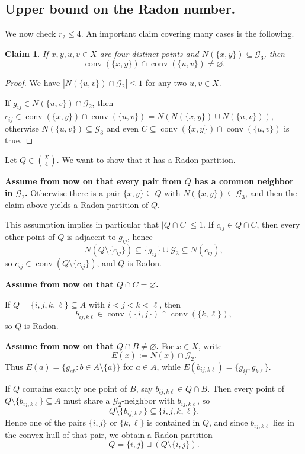 \documentclass[11pt]{article}
\newtheorem{claim}[thm]{Claim}
\theoremstyle{definition}
\newcommand{\G}{\mathcal{G}}
\newcommand{\conv}{\operatorname{conv}}
\begin{document}
\subsection{Upper bound on the Radon number.}
We now check $r_2 \leq 4$. An important claim covering many cases is the following.

\begin{claim}
If $x,y,u,v\in X$ are four distinct points and $N(\{x,y\})\subseteq\G_3$, then
\[
\conv(\{x,y\})\cap\conv(\{u,v\})\ne\varnothing.
\]
\end{claim}

\begin{proof}
    We have $|N(\{u,v\}) \cap \G_2|\leq 1$ for any two $u,v \in X$.
    
    If $g_{ij} \in N(\{u,v\}) \cap \G_2$, then $c_{ij} \in \conv(\{x,y\}) \cap \conv(\{u,v\}) = N(N(\{x,y\})\cup N(\{u,v\}))$, otherwise $N(\{u,v\}) \subseteq \G_3$ and even $C \subseteq \conv(\{x,y\}) \cap \conv(\{u,v\})$ is true.
\end{proof}

Let $Q \in \binom{X}{4}$. We want to show that it has a Radon partition. 

\textbf{Assume from now on that every pair from $Q$ has a common neighbor in $\G_2$.}
Otherwise there is a pair $\{x,y\} \subseteq Q$ with $N(\{x,y\}) \subseteq \G_3$, and then the claim above yields a Radon partition of $Q$.

This assumption implies in particular that $|Q\cap C| \le 1$. If $c_{ij}\in Q\cap C$, then every other point of $Q$ is adjacent to $g_{ij}$, hence
\[
N(Q\setminus\{c_{ij}\})\subseteq \{g_{ij}\}\cup \G_3 \subseteq N(c_{ij}),
\]
so $c_{ij}\in \conv(Q\setminus\{c_{ij}\})$, and $Q$ is Radon.

\textbf{Assume from now on that $Q\cap C=\varnothing$.}

If $Q = \{i,j,k,\ell\} \subseteq A$ with $i < j < k < \ell$, then
\[
b_{ij,k\ell } \in \conv(\{i,j\}) \cap \conv(\{k,\ell\}),
\]
so $Q$ is Radon.

\textbf{Assume from now on that $Q\cap B\neq\varnothing$.}
For $x\in X$, write
\[
E(x):=N(x)\cap \G_2.
\]
Thus $E(a)=\{g_{ab}:b\in A\setminus\{a\}\}$ for $a\in A$, while
$E(b_{ij,k\ell})=\{g_{ij},g_{k\ell}\}$.

If $Q$ contains exactly one point of $B$, say $b_{ij,k\ell}\in Q\cap B$. Then every point of $Q\setminus\{b_{ij,k\ell}\}\subseteq A$
must share a $\G_2$-neighbor with $b_{ij,k\ell}$, so
\[
Q\setminus\{b_{ij,k\ell}\}\subseteq \{i,j,k,\ell\}.
\]
Hence one of the pairs $\{i,j\}$ or $\{k,\ell\}$ is contained in $Q$, and since
$b_{ij,k\ell}$ lies in the convex hull of that pair, we obtain a Radon partition
\[
Q=\{i,j\}\sqcup (Q\setminus\{i,j\}).
\]
\end{document}
